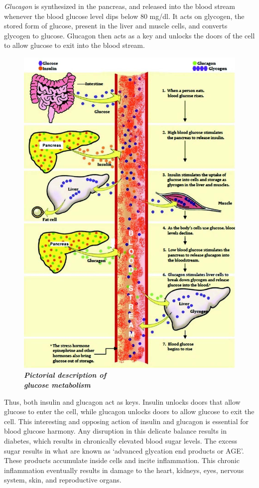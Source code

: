 \textit{Glucagon} is synthesized in the pancreas, and released into the blood stream whenever the blood glucose level dips below 80 mg/dl. It acts on glycogen, the stored form of glucose, present in the liver and muscle cells, and converts glycogen to glucose. Glucagon then acts as a key and unlocks the doors of the cell to allow glucose to exit into the blood stream.

\begin{figure}[h]
\centering
\includegraphics[scale=.9]{images/018.jpg}\\
\textbf{\textit{Pictorial description of\\ glucose metabolism}}
\end{figure}

Thus, both insulin and glucagon act as keys. Insulin unlocks doors that allow glucose to enter the cell, while glucagon unlocks doors to allow glucose to exit the cell. This interesting and opposing action of insulin and glucagon is essential for blood glucose harmony. Any disruption in this delicate balance results in diabetes, which results in chronically elevated blood sugar levels. The excess sugar results in what are known as ‘advanced glycation end products or AGE’. These products accumulate inside cells and incite inflammation. This chronic inflammation eventually results in damage to the heart, kidneys, eyes, nervous system, skin, and reproductive organs.




